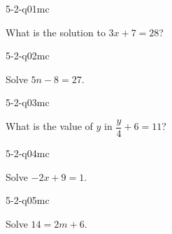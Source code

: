 

\begin{practiceQuestion}{5-2-q01}{mc}
\begin{questionText}
What is the solution to $3x + 7 = 28$?
\end{questionText}
\end{practiceQuestion}

\begin{practiceQuestion}{5-2-q02}{mc}
\begin{questionText}
Solve $5n - 8 = 27$.
\end{questionText}
\end{practiceQuestion}

\begin{practiceQuestion}{5-2-q03}{mc}
\begin{questionText}
What is the value of $y$ in $\dfrac{y}{4} + 6 = 11$?
\end{questionText}
\end{practiceQuestion}

\begin{practiceQuestion}{5-2-q04}{mc}
\begin{questionText}
Solve $-2x + 9 = 1$.
\end{questionText}
\end{practiceQuestion}

\begin{practiceQuestion}{5-2-q05}{mc}
\begin{questionText}
Solve $14 = 2m + 6$.
\end{questionText}
\end{practiceQuestion}

